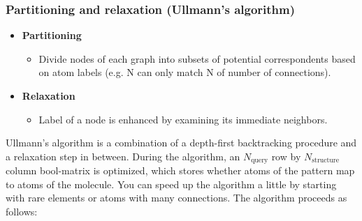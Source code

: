 \subsubsection{Partitioning and relaxation (Ullmann's algorithm)}

\begin{itemize}
    \item \textbf{Partitioning}
    \begin{itemize}
        \item Divide nodes of each graph into subsets of potential correspondents based on atom labels (e.g. N can only match N of number of connections).
    \end{itemize}
    \item \textbf{Relaxation}
    \begin{itemize}
        \item Label of a node is enhanced by examining its immediate neighbors.
    \end{itemize}
\end{itemize}

Ullmann's algorithm is a combination of a depth-first backtracking procedure and a relaxation step in between. During the algorithm, an $N_\mathrm{query}$ row by $N_\mathrm{structure}$ column bool-matrix is optimized, which stores whether atoms of the pattern map to atoms of the molecule. You can speed up the algorithm a little by starting with rare elements or atoms with many connections. The algorithm proceeds as follows:

